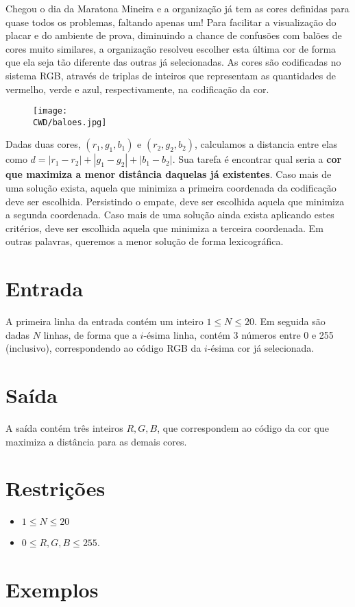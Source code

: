 Chegou o dia da Maratona Mineira e a organização já tem as cores definidas para quase todos os problemas, faltando apenas um!
Para facilitar a visualização do placar e do ambiente de prova, diminuindo a chance de confusões com balões de cores muito similares,
a organização resolveu escolher esta última cor de forma que ela seja tão diferente das outras já selecionadas. As cores são codificadas
no sistema RGB, através de triplas de inteiros que representam as quantidades de vermelho, verde e azul, respectivamente,
na codificação da cor.

\begin{figure}[H]
    \centering
    \texttt{[image: \\CWD/baloes.jpg]}
\end{figure}

Dadas duas cores, $(r_1,g_1,b_1)$ e $(r_2,g_2,b_2)$, calculamos a distancia entre elas como $d = |r_1-r_2| + |g_1-g_2| + |b_1-b_2|$.
Sua tarefa é encontrar qual seria a \textbf{cor que maximiza a menor distância daquelas já existentes}. Caso mais de uma solução exista,
aquela que minimiza a primeira coordenada da codificação deve ser escolhida. Persistindo o empate, deve ser escolhida aquela que minimiza
a segunda coordenada. Caso mais de uma solução ainda exista aplicando estes critérios, deve ser escolhida aquela que minimiza a terceira coordenada. Em outras palavras, queremos a menor solução de forma lexicográfica.

\section*{Entrada}

A primeira linha da entrada contém um inteiro $1 \leq N \leq 20$. Em seguida são dadas $N$ linhas, de forma que a $i$-ésima linha, contém 3 números
entre 0 e 255 (inclusivo), correspondendo ao código RGB da $i$-ésima cor já selecionada.

\section*{Saída}

A saída contém três inteiros $R, G, B$, que correspondem ao código da cor que maximiza a distância para as demais cores.

\section*{Restrições}

\begin{itemize}
\item $1 \leq N \leq 20$
\item $0 \leq R, G, B \leq 255$.
\end{itemize}


\section*{Exemplos}

\exemplo

